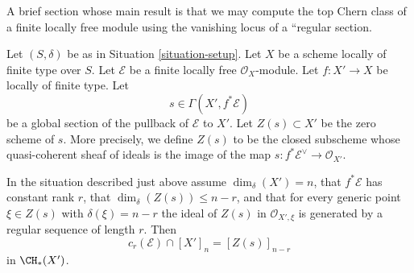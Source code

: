 \noindent
A brief section whose main result is that we may compute the
top Chern class of a finite locally free module using the
vanishing locus of a ``regular section.

\medskip\noindent
Let $(S, \delta)$ be as in Situation \ref{situation-setup}. Let $X$ be a scheme
locally of finite type over $S$. Let $\mathcal{E}$ be a finite locally
free $\mathcal{O}_X$-module. Let $f : X' \to X$ be locally of finite type. Let
$$
s \in \Gamma(X', f^*\mathcal{E})
$$
be a global section of the pullback of $\mathcal{E}$ to $X'$. Let
$Z(s) \subset X'$ be the zero scheme of $s$. More precisely, we define
$Z(s)$ to be the closed subscheme whose quasi-coherent sheaf
of ideals is the image of the map
$s : f^*\mathcal{E}^\vee \to \mathcal{O}_{X'}$.

\begin{lemma}
\label{lemma-top-chern-class}
In the situation described just above assume $\dim_\delta(X') = n$,
that $f^*\mathcal{E}$ has constant rank $r$, that
$\dim_\delta(Z(s)) \leq n - r$, and that for every generic point
$\xi \in Z(s)$ with $\delta(\xi) = n - r$ the ideal of $Z(s)$
in $\mathcal{O}_{X', \xi}$ is generated by a regular sequence
of length $r$. Then
$$
c_r(\mathcal{E}) \cap [X']_n = [Z(s)]_{n - r}
$$
in $\CH_*(X')$.
\end{lemma}

